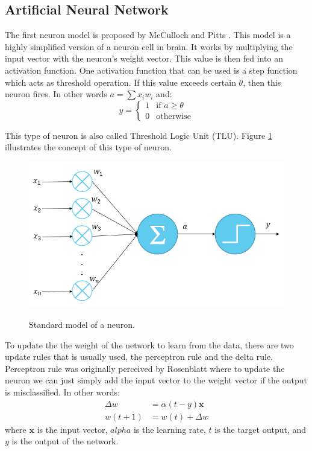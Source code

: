 \documentclass[a4paper,11pt]{kth-mag}
\begin{document}
\subsection{Artificial Neural Network}
The first neuron model is proposed by McCulloch and Pitts \cite{mcculloch1943neuron}. This model is a highly simplified version of a neuron cell in brain. It works by multiplying the input vector with the neuron's weight vector. This value is then fed into an activation function. One activation function that can be used is a step function which acts as threshold operation. If this value exceeds certain $\theta$, then this neuron fires. In other words $ a = \sum x_i w_i $ and:
\begin{equation}
y = 
	\begin{cases}
	1 & \text{if } a \geq \theta \\
	0 & \text{otherwise}
	\end{cases}
\end{equation}

This type of neuron is also called Threshold Logic Unit (TLU). Figure \ref{fig:neuron} illustrates the concept of this type of neuron.

\begin{figure}[h]
\centering
\includegraphics[scale=0.3]{image/neuron.png}
\label{fig:neuron}
\caption{Standard model of a neuron.}
\end{figure}

To update the the weight of the network to learn from the data, there are two update rules that is usually used, the perceptron rule and the delta rule. Perceptron rule was originally perceived by Rosenblatt \cite{rosenblatt1957perceptron} where to update the neuron we can just simply add the input vector to the weight vector if the output is misclassified. In other words: 
\begin{equation}
\begin{split}
\Delta w & = \alpha (t-y) \bm{x} \\
w(t+1) & = w(t) + \Delta w
\end{split}
\end{equation}
where $\bm{x}$ is the input vector, $alpha$ is the learning rate, $t$ is the target output, and $y$ is the output of the network.
\end{document}

